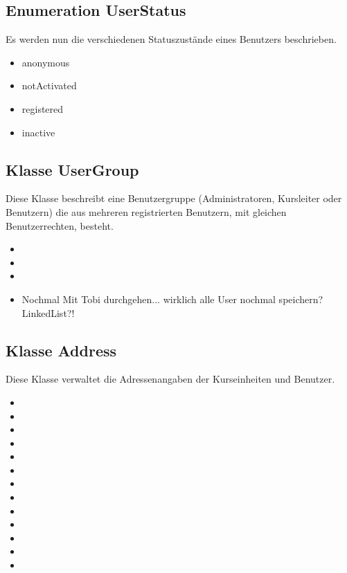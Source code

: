 	\subsection{Enumeration UserStatus}
	Es werden nun die verschiedenen Statuszustände eines Benutzers beschrieben.
	\begin{itemize}
		\item {anonymous}
		\item {notActivated}
		\item {registered}
		\item {inactive}
	\end{itemize}
	
	\subsection{Klasse UserGroup}
	Diese Klasse beschreibt eine Benutzergruppe (Administratoren, Kursleiter oder Benutzern) die aus mehreren registrierten Benutzern, mit gleichen Benutzerrechten, besteht.
	\begin{itemize}
		\item {}
		\item {}
		\item {}
		\item {}
		Nochmal Mit Tobi durchgehen... wirklich alle User nochmal speichern? LinkedList?!
		
	\end{itemize}
	
	\subsection{Klasse Address}
	Diese Klasse verwaltet die Adressenangaben der Kurseinheiten und Benutzer.
	\begin{itemize}
		\item {}
		\item {}
		\item {}
		\item {}
		\item {}
		\item {}
		\item {}
		\item {}
		\item {}
		\item {}
		\item {}
		\item {}
		\item {}
		
	\end{itemize}
	
